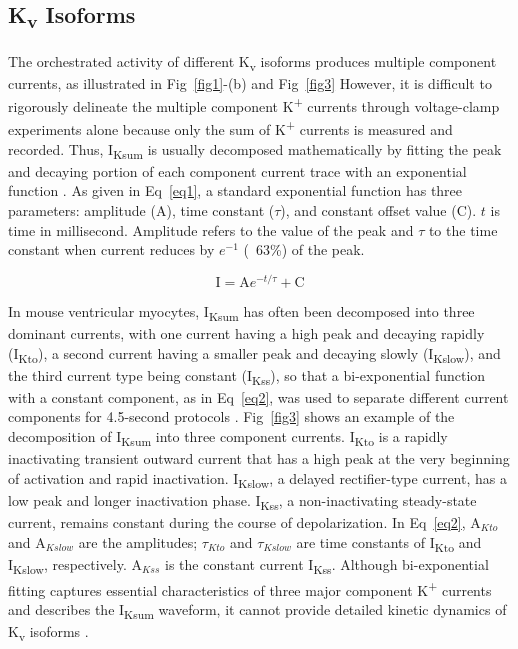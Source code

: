 \documentclass[10pt,letterpaper]{article}
\begin{document}
\subsection*{K\textsubscript{v} Isoforms}
The orchestrated activity of different K\textsubscript{v} isoforms produces multiple component currents, as illustrated in Fig~\ref{fig1}-(b) and Fig~\ref{fig3} However, it is difficult to rigorously delineate the multiple component K\textsuperscript{+} currents through voltage-clamp experiments alone because only the sum of K\textsuperscript{+} currents is measured and recorded. Thus, I\textsubscript{Ksum} is usually decomposed mathematically by fitting the peak and decaying portion of each component current trace with an exponential function \cite{brunet2004heterogeneous}. As given in Eq~\ref{eq1}, a standard exponential function has three parameters: amplitude ($\mathrm{A}$), time constant ($\tau$), and constant offset value ($\mathrm{C}$). $t$ is time in millisecond. Amplitude refers to the value of the peak and $\tau$ to the time constant when current reduces by $e^{-1}$ (~63\%) of the peak. 

\begin{equation}
    \mathrm{I} = \mathrm{A}e^{-t/\tau} + \mathrm{C}
    \label{eq1}
\end{equation}

In mouse ventricular myocytes, I\textsubscript{Ksum} has often been decomposed into three dominant currents, with one current having a high peak and decaying rapidly (I\textsubscript{Kto}), a second current having a smaller peak and decaying slowly (I\textsubscript{Kslow}), and the third current type being constant (I\textsubscript{Kss}), so that a bi-exponential function with a constant component, as in Eq~\ref{eq2}, was used to separate different current components for 4.5-second protocols \cite{ednie2015reduced}. Fig~\ref{fig3} shows an example of the decomposition of I\textsubscript{Ksum} into three component currents. I\textsubscript{Kto} is a rapidly inactivating transient outward current that has a high peak at the very beginning of activation and rapid inactivation. I\textsubscript{Kslow}, a delayed rectifier-type current, has a low peak and longer inactivation phase. I\textsubscript{Kss}, a non-inactivating steady-state current, remains constant during the course of depolarization. In Eq~\ref{eq2}, $\mathrm{A}_{Kto}$ and $\mathrm{A}_{Kslow}$ are the amplitudes; $\tau_{Kto}$ and $\tau_{Kslow}$ are time constants of I\textsubscript{Kto} and I\textsubscript{Kslow}, respectively. $\mathrm{A}_{Kss}$ is the constant current I\textsubscript{Kss}. Although bi-exponential fitting captures essential characteristics of three major component K\textsuperscript{+} currents and describes the I\textsubscript{Ksum} waveform, it cannot provide detailed kinetic dynamics of K\textsubscript{v} isoforms \cite{plumlee2016calibrating}. 
\end{document}
